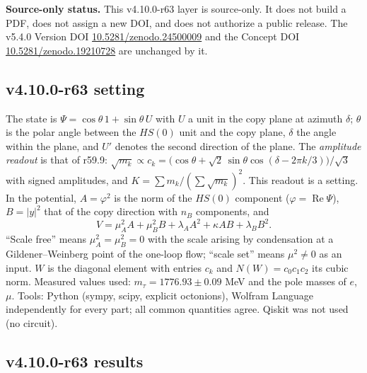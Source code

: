 \noindent\textbf{Source-only status.}
This v4.10.0-r63 layer is source-only.  It does not build a PDF, does not assign a new DOI,
and does not authorize a public release.  The v5.4.0 Version DOI
\href{https://doi.org/10.5281/zenodo.24500009}{10.5281/zenodo.24500009} and the Concept DOI
\href{https://doi.org/10.5281/zenodo.19210728}{10.5281/zenodo.19210728} are unchanged by it.

\subsection*{v4.10.0-r63 setting}
\label{subsec:v4100-r63-setting}

The state is \(\Psi=\cos\theta\,1+\sin\theta\,U\) with \(U\) a unit in the copy plane at azimuth \(\delta\); \(\theta\) is the polar angle between
the \(HS(0)\) unit and the copy plane, \(\delta\) the angle within the plane, and \(U'\) denotes the second direction of the plane.  The
\emph{amplitude readout} is that of r59.9: \(\sqrt{m_k}\propto c_k=\bigl(\cos\theta+\sqrt2\,\sin\theta\cos(\delta-2\pi k/3)\bigr)/\sqrt3\) with signed amplitudes, and
\(K=\sum m_k/(\sum\sqrt{m_k})^2\).  This readout is a setting.  In the potential, \(A=\varphi^2\) is the norm of the \(HS(0)\) component
(\(\varphi=\operatorname{Re}\Psi\)), \(B=|y|^2\) that of the copy direction with \(n_B\) components, and
\[
V=\mu_A^2A+\mu_B^2B+\lambda_AA^2+\kappa AB+\lambda_BB^2 .
\]
``Scale free'' means \(\mu_A^2=\mu_B^2=0\) with the scale arising by condensation at a Gildener--Weinberg point of the one-loop flow; ``scale
set'' means \(\mu^2\ne0\) as an input.  \(W\) is the diagonal element with entries \(c_k\) and \(N(W)=c_0c_1c_2\) its cubic norm.  Measured values
used: \(m_\tau=1776.93\pm0.09\) MeV and the pole masses of \(e\), \(\mu\).  Tools: Python (sympy, scipy, explicit octonions), Wolfram Language
independently for every part; all common quantities agree.  Qiskit was not used (no circuit).

\subsection*{v4.10.0-r63 results}
\label{subsec:v4100-r63-results}

